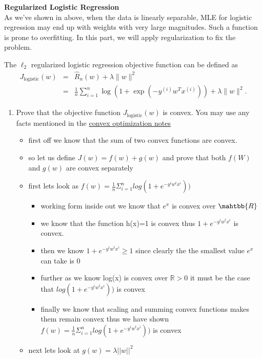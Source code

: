 \documentclass{article}
\newcommand{\nyuparagraph}[1]{\vspace{0.3cm}\textcolor{nyupurple}{\bf \large #1}\\}
\theoremstyle{plain}
\theoremstyle{definition}
\begin{document}
\nyuparagraph{\label{subsec:Regularized-Logistic-Regression}Regularized Logistic
Regression}
As we've shown in above, when the data is linearly separable,
MLE for logistic regression may end up with weights with very large magnitudes. Such a function is prone to overfitting.
In this part, we will apply regularization to fix the problem.

The $\ell_2$ regularized
logistic regression objective function can be defined as
\begin{eqnarray*}
J_{\text{logistic}}(w) & = & \hat{R}_{n}(w)+\lambda\|w\|^{2}\\
 & = & \frac{1}{n}\sum_{i=1}^{n}\log\left(1+\exp\left(-y^{(i)}w^{T}x^{(i)}\right)\right)+\lambda\|w\|^{2}.
\end{eqnarray*}
 
\begin{enumerate}
  \setcounter{enumi}{\value{saveenum}}
\item Prove that the objective function $J_{\text{logistic}}(w)$ is convex.
You may use any facts mentioned in the \href{https://davidrosenberg.github.io/mlcourse/Notes/convex-optimization.pdf}{convex optimization notes}
\begin{itemize}
    \color{blue}
    \item first off we know that the sum of two convex functions are convex. 
    \item so let us define $J(w)=f(w)+g(w)$ and prove that both $f(W)$ and $g(w)$ are convex separately
    \item first lets look as $f(w)=\frac{1}{n}\Sigma_{i=1}^{n}log(1+e^{-y^iw^tx^i}))$
    \begin{itemize}
        \item working form inside out we know that $e^x$ is convex over $\mahtbb{R}$
        \item we know that the function h(x)=1 is convex thus $1+e^{-y^iw^tx^i}$ is convex. 
        \item then we know $1+e^{-y^iw^tx^i}\geq 1$ since clearly the the smallest value $e^{x}$ can take is 0 
        \item further as we know log(x) is convex over $\mathbb{R}>0$ it must be the case that $log(1+e^{-y^iw^tx^i}))$ is convex
        \item finally we know that scaling and summing convex functions makes them remain convex thus we have shown $f(w)=\frac{1}{n}\Sigma_{i=1}^{n}log(1+e^{-y^iw^tx^i}))$ is convex
    \end{itemize}
    \item next lets look at $g(w)=\lambda||w||^2$

\end{itemize}
\end{enumerate}
\end{document}
